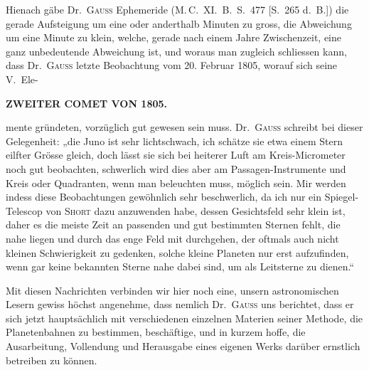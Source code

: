 \par\indent Hienach gäbe Dr.\ \textsc{Gauss} Ephemeride (M.\,C.\ XI.\ B.\ S.\ 477 [S.\ 265 d.\ B.]) die gerade Aufsteigung um eine oder anderthalb Minuten zu gross, die Abweichung um eine Minute zu klein, welche, gerade nach einem Jahre Zwischenzeit, eine ganz unbedeutende Abweichung ist, und woraus man zugleich schliessen kann, dass Dr.\ \textsc{Gauss} letzte Beobachtung vom 20. Februar 1805, worauf sich seine V.\ Ele-
\par{}
\clearpage
\thispagestyle{empty}
\noindent{}%
%
\parbox[t]{\dimexpr\linewidth-24mm\relax}{\centering\footnotesize\bfseries ZWEITER COMET VON 1805.\par}%
\makebox[12mm][r]{}\par\nobreak\medskip
\noindent mente gründeten, vorzüglich gut gewesen sein muss. Dr.~\textsc{Gauss} schreibt bei dieser Gelegenheit: „die Juno ist sehr lichtschwach, ich schätze sie etwa einem Stern eilfter Grösse gleich, doch lässt sie sich bei heiterer Luft am Kreis-Micrometer noch gut beobachten, schwerlich wird dies aber am Passagen-Instrumente und Kreis oder Quadranten, wenn man beleuchten muss, möglich sein. Mir werden indess diese Beobachtungen gewöhnlich sehr beschwerlich, da ich nur ein Spiegel-Telescop von \textsc{Short} dazu anzuwenden habe, dessen Gesichtsfeld sehr klein ist, daher es die meiste Zeit an passenden und gut bestimmten Sternen fehlt, die nahe liegen und durch das enge Feld mit durchgehen, der oftmals auch nicht kleinen Schwierigkeit zu gedenken, solche kleine Planeten nur erst aufzufinden, wenn gar keine bekannten Sterne nahe dabei sind, um als Leitsterne zu dienen.“

\par\indent Mit diesen Nachrichten verbinden wir hier noch eine, unsern astronomischen Lesern gewiss höchst angenehme, dass nemlich Dr.~\textsc{Gauss} uns berichtet, dass er sich jetzt hauptsächlich mit verschiedenen einzelnen Materien seiner Methode, die Planetenbahnen zu bestimmen, beschäftige, und in kurzem hoffe, die Ausarbeitung, Vollendung und Herausgabe eines eigenen Werks darüber ernstlich betreiben zu können.

\begin{flushright}
\end{flushright}
